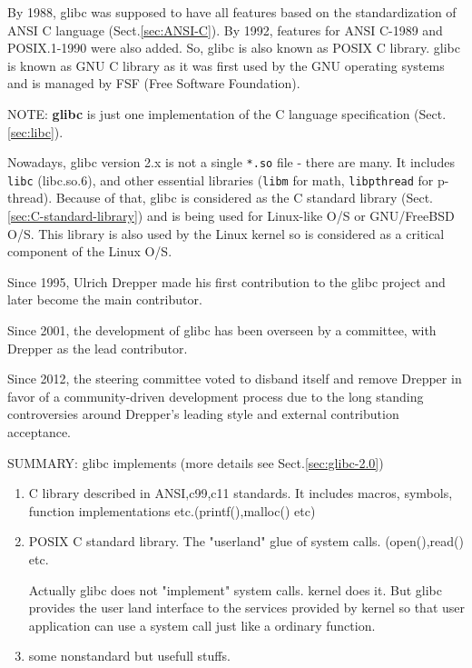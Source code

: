 By 1988, glibc was supposed to have all features based on the standardization of
ANSI C language (Sect.\ref{sec:ANSI-C}). By 1992, features for ANSI C-1989 and
POSIX.1-1990 were also added. So, glibc is also known as POSIX C library.
glibc is known as GNU C library as it was first used by the GNU operating
systems and is managed by FSF (Free Software Foundation).

NOTE: {\bf glibc} is just one implementation of the C language specification
(Sect.\ref{sec:libc}). 

Nowadays, glibc version 2.x is not a single \verb!*.so! file - there are many.
It includes \verb!libc! (libc.so.6), and other essential libraries (\verb!libm!
for math, \verb!libpthread! for p-thread). Because of that, glibc is considered
as the C standard library (Sect.\ref{sec:C-standard-library}) and is being used
for Linux-like O/S or GNU/FreeBSD O/S. This library is also used by the Linux
kernel so is considered as a critical component of the Linux O/S.

Since 1995, Ulrich Drepper made his first contribution to the glibc project and
later become the main contributor. 

Since 2001, the development of glibc has been overseen by a committee, with
Drepper as the lead contributor.

Since 2012, the steering committee voted to disband itself and remove Drepper in
favor of a community-driven development process due to  the long standing
controversies around Drepper's leading style and external contribution
acceptance.

SUMMARY: glibc implements (more details see
Sect.\ref{sec:glibc-2.0})
\begin{enumerate}
  \item C library described in ANSI,c99,c11 standards. It includes macros,
  symbols, function implementations etc.(printf(),malloc() etc)
  
  \item POSIX C standard library. The "userland" glue of system calls.
  (open(),read() etc. 
  
  Actually glibc does not "implement" system calls. kernel does it. But glibc
  provides the user land interface to the services provided by kernel so that
  user application can use a system call just like a ordinary function.
  
  \item  some nonstandard but usefull stuffs.
\end{enumerate}

